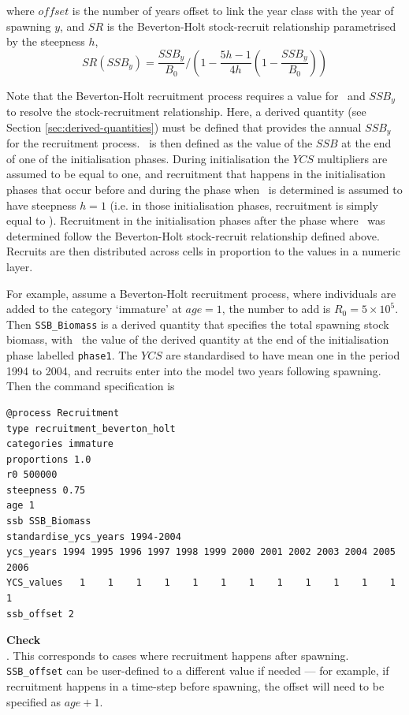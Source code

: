 where $offset$ is the number of years offset to link the year class with the year of spawning $y$, and $SR$ is the Beverton-Holt stock-recruit relationship parametrised by the steepness $h$,
\begin{equation}
SR(SSB_y) = \frac{SSB_y}{B_0} / \left( 1-\frac{5h-1}{4h} \left( 1-\frac{SSB_y}{B_0} \right) \right)
\end{equation}

Note that the Beverton-Holt recruitment process requires a value for \Bzero\ and $SSB_y$ to resolve the stock-recruitment relationship. Here, a derived quantity (see Section \ref{sec:derived-quantities}) must be defined that provides the annual $SSB_y$ for the recruitment process. \Bzero\ is then defined as the value of the $SSB$ at the end of one of the initialisation phases. During initialisation the $YCS$ multipliers are assumed to be equal to one, and recruitment that happens in the initialisation phases that occur before and during the phase when \Bzero\ is determined is assumed to have steepness $h=1$ (i.e. in those initialisation phases, recruitment is simply equal to \Rzero). Recruitment in the initialisation phases after the phase where \Bzero\ was determined follow the Beverton-Holt stock-recruit relationship defined above. Recruits are then distributed across cells in proportion to the values in a numeric layer. 

For example, assume a Beverton-Holt recruitment process, where individuals are added to the category `immature' at $age=1$, the number to add is $R_0=5 \times 10^5$. Then \texttt{SSB\_Biomass} is a derived quantity that specifies the total spawning stock biomass, with \Bzero\ the value of the derived quantity at the end of the initialisation phase labelled \texttt{phase1}. The $YCS$ are standardised to have mean one in the period 1994 to 2004, and recruits enter into the model two years following spawning. Then the command specification is

{\small{\begin{verbatim}
@process Recruitment
type recruitment_beverton_holt
categories immature
proportions 1.0
r0 500000
steepness 0.75
age 1
ssb SSB_Biomass
standardise_ycs_years 1994-2004
ycs_years 1994 1995 1996 1997 1998 1999 2000 2001 2002 2003 2004 2005 2006
YCS_values   1    1    1    1    1    1    1    1    1    1    1    1    1
ssb_offset 2
\end{verbatim}}}
\textbf{Check}\\
. This corresponds to cases where recruitment happens after spawning. \texttt{SSB\_offset} can be user-defined to a different value if needed --- for example, if recruitment happens in a time-step before spawning, the offset will need to be specified as $age + 1$.



